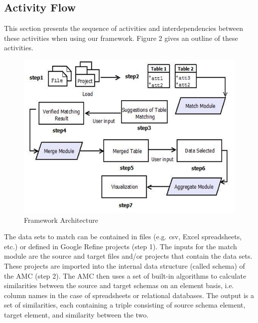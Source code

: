\documentclass{sig-alternate}
\begin{document}
\subsection{Activity Flow}
This section presents the sequence of activities and interdependencies between these activities when using our framework. Figure 2 gives an outline of these activities.
\begin{figure}[ht!]
  \centering
    \includegraphics[scale=0.4]{architecture-2.png}
  \caption{Framework Architecture}
\end{figure}
The data sets to match can be contained in files (e.g. csv, Excel spreadsheets, etc.) or defined in Google Refine projects (step 1). The inputs for the match module are the source and target files and/or projects that contain the data sets. These projects are imported into the internal data structure (called schema) of the AMC \cite{5767940} (step 2). The AMC then uses a set of built-in algorithms to calculate similarities between the source and target schemas on an element basis, i.e. column names in the case of spreadsheets or relational databases. The output is a set of similarities, each containing a triple consisting of source schema element, target element, and similarity between the two.
\end{document}
